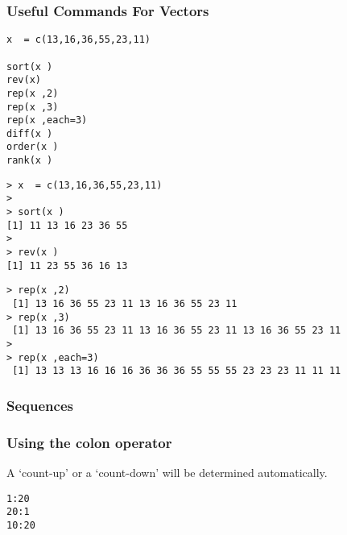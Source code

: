 \documentclass{beamer}
\begin{document}
%
\begin{frame}[fragile]
\frametitle{Useful Commands For Vectors}

\begin{framed}
\begin{verbatim}
x  = c(13,16,36,55,23,11)

sort(x )
rev(x)
rep(x ,2)
rep(x ,3)
rep(x ,each=3)
diff(x )
order(x )
rank(x )
\end{verbatim}
\end{framed}
\end{frame}
\begin{frame}[fragile]
\begin{framed}
\begin{verbatim}
> x  = c(13,16,36,55,23,11)
>
> sort(x )
[1] 11 13 16 23 36 55
>
> rev(x )
[1] 11 23 55 36 16 13
\end{verbatim}
\end{framed}
\end{frame}
\begin{frame}[fragile]
\begin{framed}
\begin{verbatim}
> rep(x ,2)
 [1] 13 16 36 55 23 11 13 16 36 55 23 11
> rep(x ,3)
 [1] 13 16 36 55 23 11 13 16 36 55 23 11 13 16 36 55 23 11
>
> rep(x ,each=3)
 [1] 13 13 13 16 16 16 36 36 36 55 55 55 23 23 23 11 11 11
 \end{verbatim}
\end{framed}
\end{frame}
\begin{frame}[fragile]

\frametitle{Sequences}
\frametitle{Using the colon operator}
A `count-up' or a `count-down' will be determined automatically.
\begin{framed}
\begin{verbatim}
1:20
20:1
10:20
\end{verbatim}
\end{framed}
\end{frame}
\end{document}
